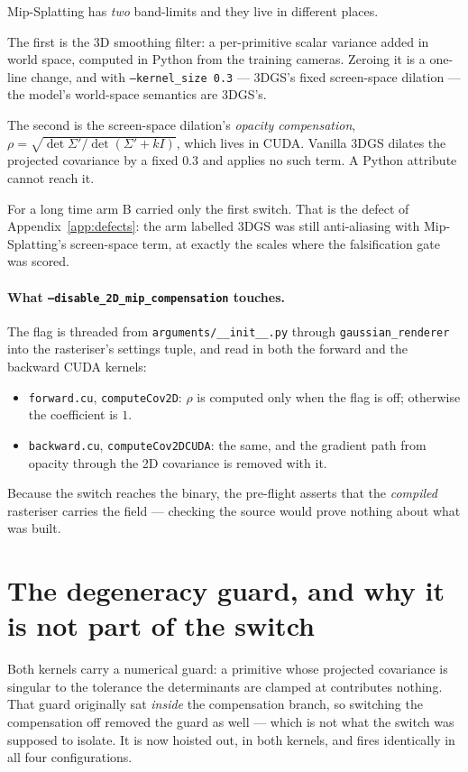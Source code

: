 Mip-Splatting has \emph{two} band-limits and they live in different places.

The first is the 3D smoothing filter: a per-primitive scalar variance added in
world space, computed in Python from the training cameras. Zeroing it is a
one-line change, and with \texttt{--kernel\_size 0.3} --- 3DGS's fixed screen-space
dilation --- the model's world-space semantics are 3DGS's.

The second is the screen-space dilation's \emph{opacity compensation},
$\rho = \sqrt{\det \Sigma' / \det(\Sigma' + kI)}$, which lives in CUDA. Vanilla
3DGS dilates the projected covariance by a fixed $0.3$ and applies no such term.
A Python attribute cannot reach it.

For a long time arm B carried only the first switch. That is the defect of
Appendix~\ref{app:defects}: the arm labelled 3DGS was still anti-aliasing with
Mip-Splatting's screen-space term, at exactly the scales where the falsification
gate was scored.

\paragraph{What \texttt{--disable\_2D\_mip\_compensation} touches.} The flag is
threaded from \texttt{arguments/\_\_init\_\_.py} through
\texttt{gaussian\_renderer} into the rasteriser's settings tuple, and read in
both the forward and the backward CUDA kernels:

\begin{itemize}[leftmargin=1.4em,itemsep=2pt]
  \item \texttt{forward.cu}, \texttt{computeCov2D}: $\rho$ is computed only when
        the flag is off; otherwise the coefficient is $1$.
  \item \texttt{backward.cu}, \texttt{computeCov2DCUDA}: the same, and the
        gradient path from opacity through the 2D covariance is removed with it.
\end{itemize}

Because the switch reaches the binary, the pre-flight asserts that the
\emph{compiled} rasteriser carries the field --- checking the source would prove
nothing about what was built.

\section{The degeneracy guard, and why it is not part of the switch}

Both kernels carry a numerical guard: a primitive whose projected covariance is
singular to the tolerance the determinants are clamped at contributes nothing.
That guard originally sat \emph{inside} the compensation branch, so switching the
compensation off removed the guard as well --- which is not what the switch was
supposed to isolate. It is now hoisted out, in both kernels, and fires
identically in all four configurations.

